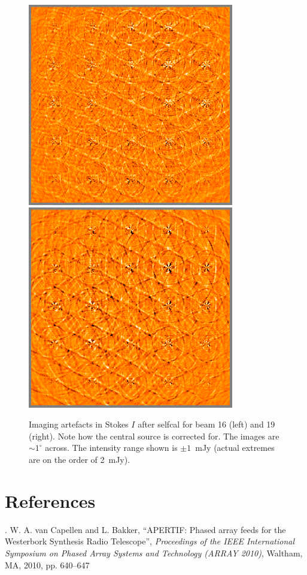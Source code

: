 \documentclass{aps2010} \special{papersize=8.5in,11in}
\begin{document}
\begin{figure}
\includegraphics[width=9cm]{diff15cal}%
\includegraphics[width=9cm]{diff18cal}%
\caption{\label{fig:diff-cal}Imaging artefacts in Stokes $I$ after selfcal for beam 16 (left) and 19 (right). Note how the central source is corrected for. The images are $\sim1^\circ$ across. The intensity range shown is $\pm1$~mJy (actual extremes are on the order of 2~mJy).}
\end{figure}

\section{References}

. W. A. van Capellen and L. Bakker, ``APERTIF: Phased array feeds for the Westerbork Synthesis Radio Telescope'', \emph{Proceedings of the IEEE International Symposium on Phased Array Systems and Technology (ARRAY 2010)}, Waltham, MA, 2010, pp. 640--647
\end{document}
